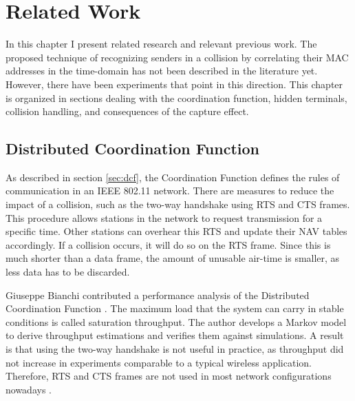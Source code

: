 
\chapter{Related Work}\label{ch:relatedwork}
\glsresetall %

In this chapter I present related research and relevant previous work. The proposed technique of recognizing senders in a collision by correlating their MAC addresses in the time-domain has not been described in the literature yet. However, there have been experiments that point in this direction. This chapter is organized in sections dealing with the coordination function, hidden terminals, collision handling, and consequences of the capture effect.



\section{Distributed Coordination Function}

As described in section \ref{sec:dcf}, the Coordination Function defines the rules of communication in an IEEE 802.11 network. There are measures to reduce the impact of a collision, such as the two-way handshake using \gls{RTS} and \gls{CTS} frames. This procedure allows stations in the network to request transmission for a specific time. Other stations can overhear this \gls{RTS} and update their \gls{NAV} tables accordingly. If a collision occurs, it will do so on the \gls{RTS} frame. Since this is much shorter than a data frame, the amount of unusable air-time is smaller, as less data has to be discarded.

Giuseppe Bianchi contributed a performance analysis of the Distributed Coordination Function \cite{bianchi2000}. The maximum load that the system can carry in stable conditions is called saturation throughput. The author develops a Markov model to derive throughput estimations and verifies them against simulations. A result is that using the two-way handshake is not useful in practice, as throughput did not increase in experiments comparable to a  typical wireless application. Therefore, \gls{RTS} and \gls{CTS} frames are not used in most network configurations nowadays \cite{bianchi2000, gollakota2008}.\\


